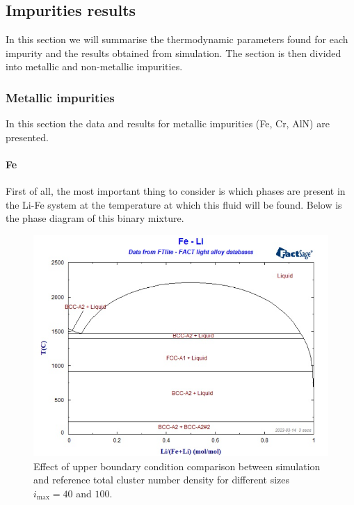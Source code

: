 \subsection{Impurities results}
In this section we will summarise the thermodynamic parameters found for each impurity and the results obtained from simulation.
The section is then divided into metallic and non-metallic impurities. 
\subsubsection{Metallic impurities}
In this section the data and results for metallic impurities (Fe, Cr, AlN) are presented.
\paragraph{Fe}

First of all, the most important thing to consider is which phases are present in the Li-Fe system at the temperature at 
which this fluid will be found. Below is the phase diagram of this binary mixture.
\begin{figure}[H]
    \centering
    \includegraphics[width=0.9\linewidth]{Fe-Li_phase_diagram.png}
    \caption{Effect of upper boundary condition comparison between simulation and reference total cluster number density for different sizes $i_{\text{max}} = 40$ and $100$.}
    \label{fig:fe_li_diagram}
\end{figure}


